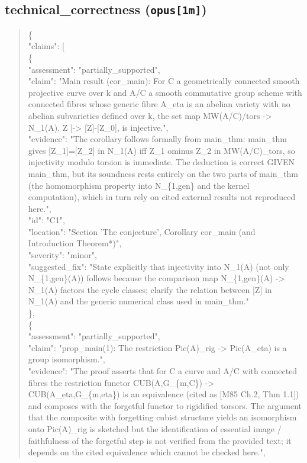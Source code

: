\documentclass[11pt]{article}
\begin{document}
\subsection*{technical\_correctness (\texttt{opus[1m]})}
\begin{quote}\small\ttfamily\raggedright
\{\\
  "claims": [\\
    \{\\
      "assessment": "partially\_supported",\\
      "claim": "Main result (cor\_main): For C a geometrically connected smooth projective curve over k and A/C a smooth commutative group scheme with connected fibres whose generic fibre A\_eta is an abelian variety with no abelian subvarieties defined over k, the set map MW(A/C)/tors -> N\_1(A), Z |-> [Z]-[Z\_0], is injective.",\\
      "evidence": "The corollary follows formally from main\_thm: main\_thm gives [Z\_1]=[Z\_2] in N\_1(A) iff Z\_1 ominus Z\_2 in MW(A/C)\_tors, so injectivity modulo torsion is immediate. The deduction is correct GIVEN main\_thm, but its soundness rests entirely on the two parts of main\_thm (the homomorphism property into N\_\{1,gen\} and the kernel computation), which in turn rely on cited external results not reproduced here.",\\
      "id": "C1",\\
      "location": "Section 'The conjecture', Corollary cor\_main (and Introduction Theorem*)",\\
      "severity": "minor",\\
      "suggested\_fix": "State explicitly that injectivity into N\_1(A) (not only N\_\{1,gen\}(A)) follows because the comparison map N\_\{1,gen\}(A) -> N\_1(A) factors the cycle classes; clarify the relation between [Z] in N\_1(A) and the generic numerical class used in main\_thm."\\
    \},\\
    \{\\
      "assessment": "partially\_supported",\\
      "claim": "prop\_main(1): The restriction Pic(A)\_rig -> Pic(A\_eta) is a group isomorphism.",\\
      "evidence": "The proof asserts that for C a curve and A/C with connected fibres the restriction functor CUB(A,G\_\{m,C\}) -> CUB(A\_eta,G\_\{m,eta\}) is an equivalence (cited as [M85 Ch.2, Thm 1.1]) and composes with the forgetful functor to rigidified torsors. The argument that the composite with forgetting cubist structure yields an isomorphism onto Pic(A)\_rig is sketched but the identification of essential image / faithfulness of the forgetful step is not verified from the provided text; it depends on the cited equivalence which cannot be checked here.",\\

\end{quote}
\end{document}
